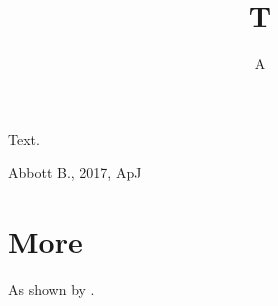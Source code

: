 \documentclass{mnras}
\begin{document}
\title{T}\author{A}\maketitle
Text.
\begin{thebibliography}{}
 Abbott B., 2017, ApJ
\end{thebibliography}
\appendix
\section{More}
As shown by \cite{a}.
\end{document}
